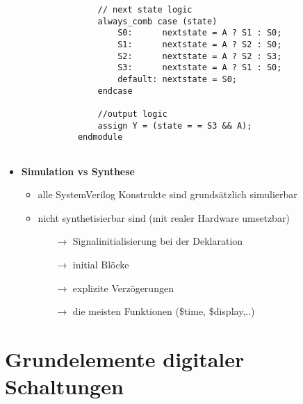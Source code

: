 \begin{itemize}
\begin{itemize}
\begin{lstlisting}
			// next state logic
			always_comb case (state)
				S0: 	 nextstate = A ? S1 : S0;
				S1:		 nextstate = A ? S2 : S0;
				S2: 	 nextstate = A ? S2 : S3;
				S3: 	 nextstate = A ? S1 : S0;
				default: nextstate = S0;
			endcase
			
			//output logic
			assign Y = (state = = S3 && A);
		endmodule
				
		\end{lstlisting}
	\end{itemize}
	
\item \textbf{Simulation vs Synthese}
	\begin{itemize}
	\item alle SystemVerilog Konstrukte sind grundsätzlich simulierbar
	\item nicht synthetisierbar sind (mit realer Hardware umsetzbar)
		\begin{itemize}
		\item[$\rightarrow$] Signalinitialisierung bei der Deklaration
		\item[$\rightarrow$] initial Blöcke
		\item[$\rightarrow$] explizite Verzögerungen
		\item[$\rightarrow$] die meisten Funktionen (\$time, \$display,..)
		\end{itemize}		 
	\end{itemize}
\end{itemize}


\section{Grundelemente digitaler Schaltungen}
